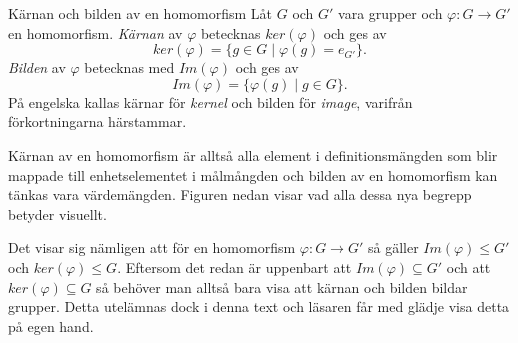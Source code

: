 \documentclass{article}
\theoremstyle{definition}
\begin{document}
\begin{mydef}{Kärnan och bilden av en homomorfism}{}
  Låt $G$ och $G'$ vara grupper och $\varphi : G \rightarrow G'$ en homomorfism.
  \textit{Kärnan} av $\varphi$ betecknas $ker(\varphi)$
  och ges av 
  \[ker(\varphi) = \{g \in G \; | \; \varphi(g) = e_{G'}\}.\]
  \textit{Bilden} av $\varphi$ betecknas med $Im(\varphi)$ och ges av 
  \[Im(\varphi) = \{\varphi(g) \; | \; g \in G\}.\]
  På engelska kallas kärnar för \textit{kernel} och bilden för \textit{image}, varifrån 
  förkortningarna härstammar.
\end{mydef}
Kärnan av en homomorfism är alltså alla element i definitionsmängden som blir mappade 
till enhetselementet i målmångden och bilden av en homomorfism kan tänkas vara värdemängden. 
Figuren nedan visar vad alla dessa nya begrepp betyder visuellt.
\begin{center}
\end{center}

Det visar sig nämligen att för en homomorfism $\varphi : G \rightarrow G'$ så gäller
$Im(\varphi) \le G'$ och $ker(\varphi) \le G$. Eftersom det redan är uppenbart att
$Im(\varphi) \subseteq G'$
och att $ker(\varphi) \subseteq G$ så behöver man alltså bara visa att kärnan och bilden bildar 
grupper. Detta utelämnas dock i denna text och läsaren får med glädje visa detta på egen hand.
\end{document}
